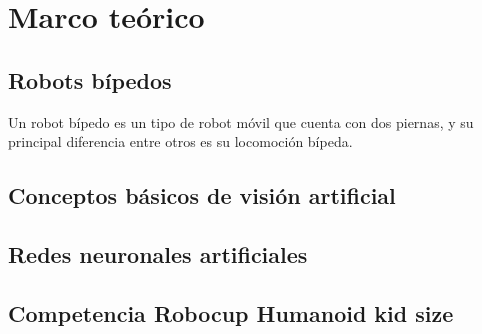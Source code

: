 \chapter{Marco teórico}
\section{Robots bípedos}
Un robot bípedo es un tipo de robot móvil que cuenta con dos piernas, y su principal diferencia entre otros es su locomoción bípeda. \cite{yang2017stateart} 
\section{Conceptos básicos de visión artificial} 

\section{Redes neuronales artificiales}
    
\section{Competencia Robocup Humanoid kid size}
